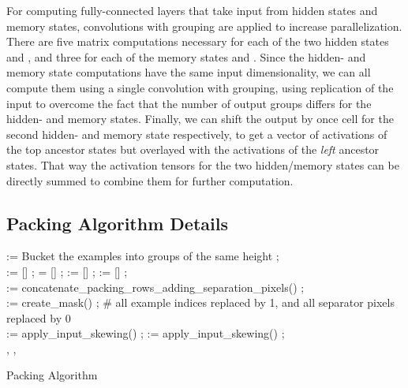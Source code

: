 \documentclass[conference]{IEEEtran}
\begin{document}
For computing fully-connected layers that take input from hidden states  and memory states, convolutions with grouping 
are applied to increase parallelization. There are five matrix computations necessary 
for each of the two hidden states  and , and three for each of the memory states  and . 
Since the hidden- and memory state computations have the same input dimensionality, 
we can all compute them using a single convolution with grouping, using replication of the input to overcome the fact that 
the number of output groups differs for the hidden- and memory states. 
Finally, we can shift the output by once cell for the second hidden- and memory state respectively, 
to get a vector of activations of the top ancestor states but overlayed with the activations of the \emph{left} ancestor states. 
That way the activation tensors for the two hidden/memory states can be directly summed to combine them for further computation.


\subsection{Packing Algorithm Details}
\label{appendix:packing-algorithm-pseudocode}

\begin{algorithm*}
 := Bucket the examples into groups of the same height ;\\
   :=  [] ;  = [] ;  := [] ;  := [] ; \\
   := concatenate\_packing\_rows\_adding\_separation\_pixels() ;\\
   := create\_mask() ; \# all example indices replaced by 1, and all separator pixels replaced by 0   \\
   := apply\_input\_skewing() ;  := apply\_input\_skewing() ; \\
  \Return , , 
  \vspace{0.2cm}
 \caption{Packing Algorithm}
 \label{algorithm:packing_algorithm}
\end{algorithm*}
\end{document}
